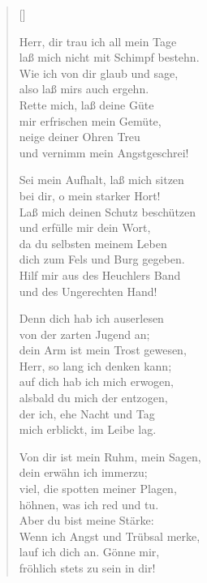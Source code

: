 \begin{multicols}{2}
\settowidth{\versewidth}{Herr, dir trau ich all mein Tage}
\begin{verse}[\versewidth]

 Herr, dir trau ich all mein Tage\\
laß mich nicht mit Schimpf bestehn.\\
Wie ich von dir glaub und sage,\\
also laß mirs auch ergehn.\\
Rette mich, laß deine Güte\\
mir erfrischen mein Gemüte,\\
neige deiner Ohren Treu\\
und vernimm mein Angstgeschrei!

 Sei mein Aufhalt, laß mich sitzen\\
bei dir, o mein starker Hort!\\
Laß mich deinen Schutz beschützen\\
und erfülle mir dein Wort,\\
da du selbsten meinem Leben\\
dich zum Fels und Burg gegeben.\\
Hilf mir aus des Heuchlers Band\\
und des Ungerechten Hand!

 Denn dich hab ich auserlesen\\
von der zarten Jugend an;\\
dein Arm ist mein Trost gewesen,\\
Herr, so lang ich denken kann;\\
auf dich hab ich mich erwogen,\\
alsbald du mich der entzogen,\\
der ich, ehe Nacht und Tag\\
mich erblickt, im Leibe lag.

 Von dir ist mein Ruhm, mein Sagen,\\
dein erwähn ich immerzu;\\
viel, die spotten meiner Plagen,\\
höhnen, was ich red und tu.\\
Aber du bist meine Stärke:\\
Wenn ich Angst und Trübsal merke,\\
lauf ich dich an. Gönne mir,\\
fröhlich stets zu sein in dir!


\end{verse}
\end{multicols}
